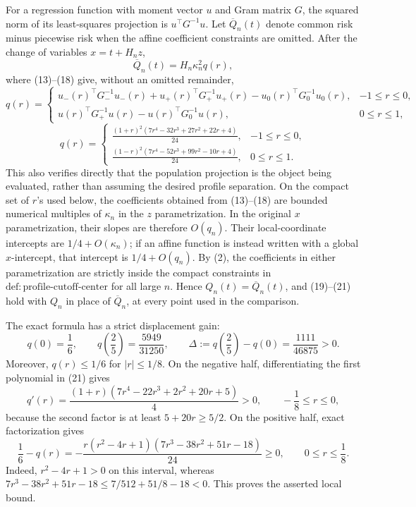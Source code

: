 For a regression function with moment vector \(u\) and Gram matrix
\(G\), the squared norm of its least-squares projection is
\(u^\top G^{-1}u\).  Let \(\overline Q_n(t)\) denote common risk minus
piecewise risk when the affine coefficient constraints are omitted.
After the change of variables \(x=t+H_nz\),
\[
 \overline Q_n(t)=H_n\kappa_n^2q(r),
 \tag{19}
\]
where (13)--(18) give, without an omitted remainder,
\[
 q(r)=
 \begin{cases}
 u_-(r)^\top G_-^{-1}u_-(r)
 +u_+(r)^\top G_+^{-1}u_+(r)
 -u_0(r)^\top G_0^{-1}u_0(r),&-1\le r\le0,\\[3pt]
 u(r)^\top G_+^{-1}u(r)-u(r)^\top G_0^{-1}u(r),&0\le r\le1,
 \end{cases}
 \tag{20}
\]
\[
 q(r)=
 \begin{cases}
 \displaystyle
 \frac{(1+r)^2(7r^4-32r^3+27r^2+22r+4)}{24},&-1\le r\le0,\\[7pt]
 \displaystyle
 \frac{(1-r)^2(7r^4-52r^3+99r^2-10r+4)}{24},&0\le r\le1.
 \end{cases}
 \tag{21}
\]
This also verifies directly that the population projection is the
object being evaluated, rather than assuming the desired profile
separation.  On the compact set of \(r\)'s used below, the coefficients
obtained from (13)--(18) are bounded numerical multiples of
\(\kappa_n\) in the \(z\) parametrization.  In the original
\(x\) parametrization, their slopes are therefore \(O(q_n)\).  Their
local-coordinate intercepts are \(1/4+O(\kappa_n)\); if an affine
function is instead written with a global \(x\)-intercept, that
intercept is \(1/4+O(q_n)\).  By (2), the coefficients in either
parametrization are strictly inside the compact constraints in
\(\mathrm{def:profile\mbox{-}cutoff\mbox{-}center}\) for all large
\(n\).  Hence \(Q_n(t)=\overline Q_n(t)\), and (19)--(21) hold with
\(Q_n\) in place of \(\overline Q_n\), at every point used in the
comparison.

The exact formula has a strict displacement gain:
\[
 q(0)=\frac16,
 \qquad
 q\left(\frac25\right)=\frac{5949}{31250},
 \qquad
 \Delta:=q\left(\frac25\right)-q(0)
       =\frac{1111}{46875}>0.
 \tag{22}
\]
Moreover, \(q(r)\le1/6\) for \(|r|\le1/8\).  On the negative half,
differentiating the first polynomial in (21) gives
\[
 q'(r)=\frac{(1+r)(7r^4-22r^3+2r^2+20r+5)}4>0,
 \qquad -\frac18\le r\le0,
 \tag{23}
\]
because the second factor is at least
\(5+20r\ge5/2\).  On the positive half, exact factorization gives
\[
 \frac16-q(r)
 =-\frac{r(r^2-4r+1)(7r^3-38r^2+51r-18)}{24}\ge0,
 \qquad 0\le r\le\frac18.
 \tag{24}
\]
Indeed, \(r^2-4r+1>0\) on this interval, whereas
\(7r^3-38r^2+51r-18\le7/512+51/8-18<0\).  This proves the asserted
local bound.

